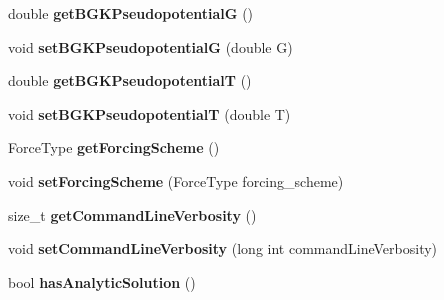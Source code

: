 \begin{DoxyCompactItemize}
\item 
\hypertarget{classnatrium_1_1SolverConfiguration_a183655b5e39571c408c28ed2b94cb49b}{
double {\bfseries getBGKPseudopotentialG} ()}
\label{classnatrium_1_1SolverConfiguration_a183655b5e39571c408c28ed2b94cb49b}

\item 
\hypertarget{classnatrium_1_1SolverConfiguration_aaa116d79971339eeb78dcd8b9f557628}{
void {\bfseries setBGKPseudopotentialG} (double G)}
\label{classnatrium_1_1SolverConfiguration_aaa116d79971339eeb78dcd8b9f557628}

\item 
\hypertarget{classnatrium_1_1SolverConfiguration_ac783bdeec57a5344b795eee009e1617a}{
double {\bfseries getBGKPseudopotentialT} ()}
\label{classnatrium_1_1SolverConfiguration_ac783bdeec57a5344b795eee009e1617a}

\item 
\hypertarget{classnatrium_1_1SolverConfiguration_ac02282d442294c957bbb0481cebd085f}{
void {\bfseries setBGKPseudopotentialT} (double T)}
\label{classnatrium_1_1SolverConfiguration_ac02282d442294c957bbb0481cebd085f}

\item 
\hypertarget{classnatrium_1_1SolverConfiguration_adc93e87425a89768b20379027348fa73}{
ForceType {\bfseries getForcingScheme} ()}
\label{classnatrium_1_1SolverConfiguration_adc93e87425a89768b20379027348fa73}

\item 
\hypertarget{classnatrium_1_1SolverConfiguration_acbd217e2adb33b26b16eae39e7759ce4}{
void {\bfseries setForcingScheme} (ForceType forcing\_\-scheme)}
\label{classnatrium_1_1SolverConfiguration_acbd217e2adb33b26b16eae39e7759ce4}

\item 
\hypertarget{classnatrium_1_1SolverConfiguration_ac1954ee6d225807f947222c437fcd6a4}{
size\_\-t {\bfseries getCommandLineVerbosity} ()}
\label{classnatrium_1_1SolverConfiguration_ac1954ee6d225807f947222c437fcd6a4}

\item 
\hypertarget{classnatrium_1_1SolverConfiguration_a906afb09b544bf2137c0d3bf9214b4a5}{
void {\bfseries setCommandLineVerbosity} (long int commandLineVerbosity)}
\label{classnatrium_1_1SolverConfiguration_a906afb09b544bf2137c0d3bf9214b4a5}

\item 
\hypertarget{classnatrium_1_1SolverConfiguration_a43270017646e2efa400ae84d644ac897}{
bool {\bfseries hasAnalyticSolution} ()}
\label{classnatrium_1_1SolverConfiguration_a43270017646e2efa400ae84d644ac897}


\end{DoxyCompactItemize}
